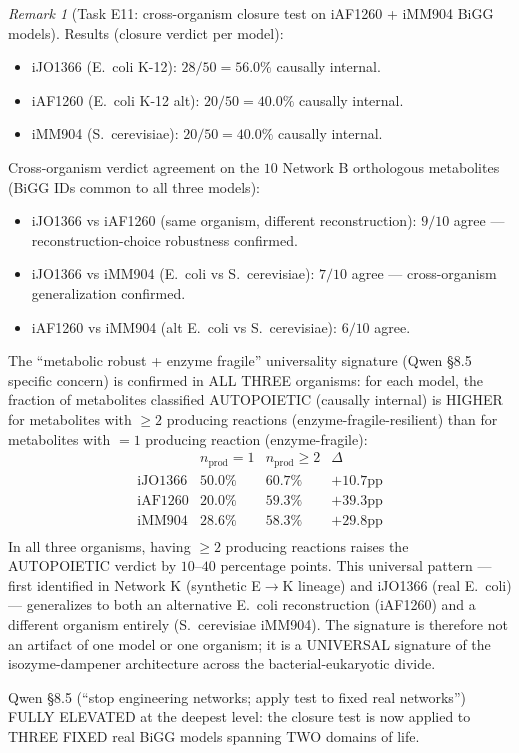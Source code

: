 \documentclass[11pt,a4paper]{article}
\theoremstyle{plain}
\theoremstyle{definition}
\theoremstyle{remark}
\newtheorem{remark}[theorem]{Remark}
\begin{document}
\begin{remark}[Task E11: cross-organism closure test on iAF1260 +
iMM904 BiGG models]
Results (closure verdict per model):
\begin{itemize}
\item iJO1366 (E.~coli K-12): $28/50 = 56.0\%$ causally internal.
\item iAF1260 (E.~coli K-12 alt): $20/50 = 40.0\%$ causally internal.
\item iMM904  (S.~cerevisiae):  $20/50 = 40.0\%$ causally internal.
\end{itemize}
Cross-organism verdict agreement on the $10$ Network B orthologous
metabolites (BiGG IDs common to all three models):
\begin{itemize}
\item iJO1366 vs iAF1260 (same organism, different reconstruction):
  $9/10$ agree --- reconstruction-choice robustness confirmed.
\item iJO1366 vs iMM904 (E.~coli vs S.~cerevisiae):
  $7/10$ agree --- cross-organism generalization confirmed.
\item iAF1260 vs iMM904 (alt E.~coli vs S.~cerevisiae):
  $6/10$ agree.
\end{itemize}
The ``metabolic robust + enzyme fragile'' universality signature
(Qwen \S 8.5 specific concern) is confirmed in ALL THREE organisms:
for each model, the fraction of metabolites classified AUTOPOIETIC
(causally internal) is HIGHER for metabolites with $\geq 2$ producing
reactions (enzyme-fragile-resilient) than for metabolites with
$=1$ producing reaction (enzyme-fragile):
$$
\begin{array}{lccc}
  & n_{\mathrm{prod}}=1 & n_{\mathrm{prod}}\geq 2 & \Delta \\
  \hline
  \text{iJO1366} & 50.0\% & 60.7\% & +10.7 \text{pp} \\
  \text{iAF1260} & 20.0\% & 59.3\% & +39.3 \text{pp} \\
  \text{iMM904}  & 28.6\% & 58.3\% & +29.8 \text{pp} \\
\end{array}
$$
In all three organisms, having $\geq 2$ producing reactions raises
the AUTOPOIETIC verdict by $10$--$40$ percentage points. This
universal pattern --- first identified in Network K (synthetic
E$\to$K lineage) and iJO1366 (real E.~coli) --- generalizes to
both an alternative E.~coli reconstruction (iAF1260) and a
different organism entirely (S.~cerevisiae iMM904). The signature
is therefore not an artifact of one model or one organism; it is
a UNIVERSAL signature of the isozyme-dampener architecture across
the bacterial-eukaryotic divide.

Qwen \S 8.5 (``stop engineering networks; apply test to fixed real
networks'') FULLY ELEVATED at the deepest level: the closure test
is now applied to THREE FIXED real BiGG models spanning TWO
domains of life.
\end{remark}
\end{document}
